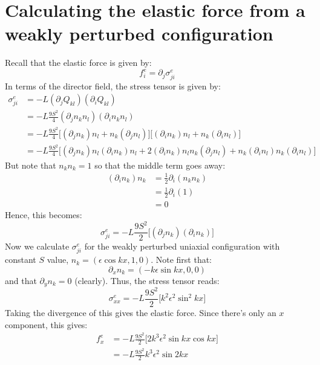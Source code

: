\documentclass[reqno]{article}
\begin{document}
	\section{Calculating the elastic force from a weakly perturbed configuration}
	Recall that the elastic force is given by:
	\begin{equation}
		f^e_i = \partial_j \sigma^e_{ji}
	\end{equation}
	In terms of the director field, the stress tensor is given by:
	\begin{equation}
	\begin{split}
		\sigma^e_{ji} &= -L \left( \partial_j Q_{kl} \right) \left( \partial_i Q_{kl} \right) \\
		&= -L \frac{9S^2}{4} \left( \partial_j n_k n_l \right)
		\left( \partial_i n_k n_l \right) \\
		&= -L \frac{9S^2}{4} \bigl[ (\partial_j n_k) n_l
		+ n_k (\partial_j n_l) \bigr]
		\bigl[ (\partial_i n_k) n_l
		+ n_k (\partial_i n_l) \bigr]\\
		&= -L \frac{9S^2}{4} \biggl[ (\partial_j n_k) n_l (\partial_i n_k) n_l
		+ 2 (\partial_i n_k) n_l n_k (\partial_j n_l)
		+  n_k (\partial_i n_l)  n_k (\partial_i n_l)
		\biggr]
	\end{split}
	\end{equation}
	But note that $n_k n_k = 1$ so that the middle term goes away:
	\begin{equation}
	\begin{split}
		\left( \partial_i n_k \right) n_k &= \tfrac12 \partial_i \left( n_k n_k \right) \\
		&= \tfrac12 \partial_i \left( 1 \right) \\
		&= 0
	\end{split}
	\end{equation}
	Hence, this becomes:
	\begin{equation}
		\sigma^e_{ji} = -L \frac{9S^2}{2} \bigl[
		\left( \partial_j n_k \right) \left( \partial_i n_k \right)
		\bigr]
	\end{equation}
	Now we calculate $\sigma^e_{ji}$ for the weakly perturbed uniaxial configuration with constant $S$ value, $n_k = \left( \epsilon \cos k x, 1, 0 \right)$.
	Note first that:
	\begin{equation}
		\partial_x n_k = \left( -k \epsilon \sin kx, 0, 0 \right)
	\end{equation}
	and that $\partial_y n_k = 0$ (clearly).
	Thus, the stress tensor reads:
	\begin{equation}
		\sigma^e_{xx} = -L \frac{9 S^2}{2}
		\bigl[
		k^2 \epsilon^2 \sin^2 kx
		\bigr]
	\end{equation}
	Taking the divergence of this gives the elastic force. 
	Since there's only an $x$ component, this gives:
	\begin{equation}
	\begin{split}
		f^e_{x} &= -L \frac{9 S^2}{2}
		\bigl[
		2 k^3 \epsilon^2 \sin kx \cos kx
		\bigr] \\
		&= -L \frac{9 S^2}{2} k^3 \epsilon^2 \sin 2kx
	\end{split}
	\end{equation}
	
\end{document}
